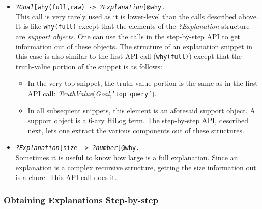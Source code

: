 \begin{itemize}
\item  \texttt{\textnormal{\emph{?Goal}}[why(full,raw) -> \texttt{\textnormal{\emph{?Explanation}}}]@\bs{}why.}
  \\
  This call is very rarely used as it is lower-level than the calls
  described above. It is like \texttt{why(full)} except that the elements of the
  \emph{?Explanation} structure are \emph{support objects}. One can use the
  calls in the step-by-step API to get information out of these objects.
  The structure of an explanation snippet in this case is also similar to
  the first API call (\texttt{why(full)})  except that the truth-value
  portion of the snippet is as follows:
  \begin{itemize}
  \item    In the very top snippet, the truth-value portion is the same as
    in the first API call:  \emph{TruthValue}(\emph{Goal},\texttt{'top query'}).
  \item In all subsequent snippets, this element is an aforesaid support object.
    A support object is a 6-ary HiLog term. The step-by-step API, described
    next, lets one extract the various components out of these structures.
  \end{itemize}

\item \texttt{\textnormal{\emph{?Explanation}}[size ->
    \texttt{\textnormal{\emph{?number}}}]@\bs{}why.}
  \\
  Sometimes it is useful to know how large is a full explanation. Since
  an explanation is a complex recursive structure, getting the size information
  out is a chore. This API call does it.
\end{itemize}


\subsubsection{Obtaining Explanations Step-by-step}

